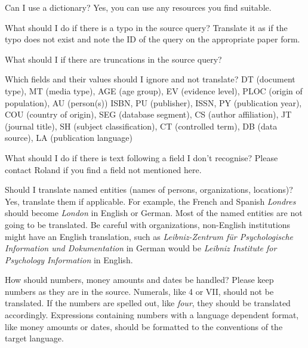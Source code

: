 \documentclass[a4paper,10pt]{article}
\newenvironment{faq}{\begin{description}[style=nextline]}{\end{description}}
\newcommand{\cris}[1]{{\color{red}{#1}}}
\begin{document}
\begin{faq}

  \item[Can I use a dictionary?]
 Yes, you can use any resources you find suitable.
  
  \item[What should I do if there is a typo in the source query?]
    Translate it as if the typo does not exist and note the ID of the query on the appropriate paper form.

  \item[What should I if there are truncations in the source query?]
\cris{RR: No idea. Report it, so we can deal with this later?!}

    
  \item[Which fields and their values should I ignore and not translate?]
  DT (document type), MT (media type), AGE (age group), EV (evidence level), PLOC (origin of population), AU (person(s))
  ISBN, PU (publisher), ISSN, PY (publication year), COU (country of origin), SEG (database segment), CS (author affiliation), JT (journal title), SH (subject classification), CT (controlled term), DB (data source), LA (publication language)
  
  \item[What should I do if there is text following a field I don't recognise?]
    Please contact Roland if you find a field not mentioned here.
    
  \item[Should I translate named entities (names of persons, organizations, locations)?]
Yes, translate them if applicable. For example, the French and Spanish \textit{Londres} should become \textit{London} in English or German. Most of the named entities are not going to be translated. Be careful with organizations, non-English institutions might have an English translation, such as \textit{Leibniz-Zentrum f\"ur Psychologische Information und Dokumentation} in German would be \textit{Leibniz Institute for Psychology Information} in English. 

\item[How should numbers, money amounts and dates be handled?]
Please keep numbers as they are in the source. Numerals, like 4 or VII, should not be translated. If the numbers are spelled out, like \emph{four}, they should be translated accordingly. Expressions containing numbers with a language dependent format, like money amounts or dates, should be formatted to the conventions of the target language.
    
\end{faq}
\end{document}
